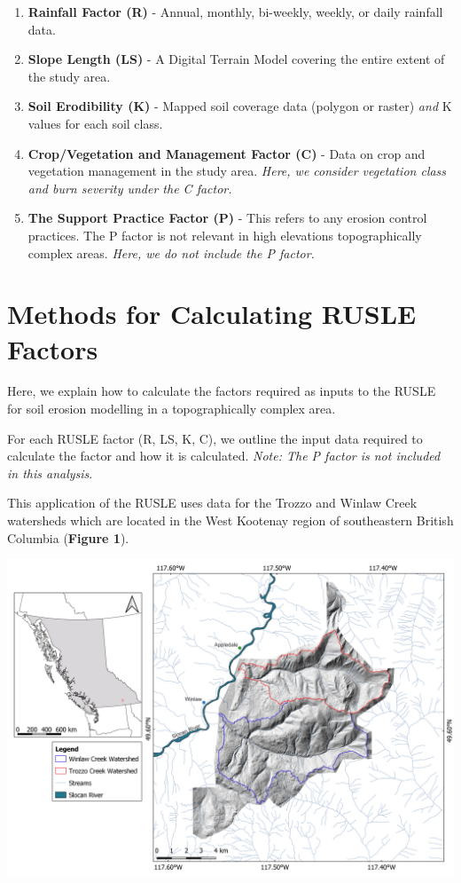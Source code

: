 \documentclass[
]{article}
\begin{document}
\begin{enumerate}
\def\labelenumi{\arabic{enumi}.}
\item
  \textbf{Rainfall Factor (R)} - Annual, monthly, bi-weekly, weekly, or daily rainfall data.
\item
  \textbf{Slope Length (LS)} - A Digital Terrain Model covering the entire extent of the study area.
\item
  \textbf{Soil Erodibility (K)} - Mapped soil coverage data (polygon or raster) \emph{and} K values for each soil class.
\item
  \textbf{Crop/Vegetation and Management Factor (C)} - Data on crop and vegetation management in the study area. \emph{Here, we consider vegetation class and burn severity under the C factor.}
\item
  \textbf{The Support Practice Factor (P)} - This refers to any erosion control practices. The P factor is not relevant in high elevations topographically complex areas. \emph{Here, we do not include the P factor.}
\end{enumerate}

\hypertarget{sec-methods-for-calculating-rusle-factors}{%
\section*{Methods for Calculating RUSLE Factors}\label{sec-methods-for-calculating-rusle-factors}}

Here, we explain how to calculate the factors required as inputs to the RUSLE for soil erosion modelling in a topographically complex area.

For each RUSLE factor (R, LS, K, C), we outline the input data required to calculate the factor and how it is calculated. \emph{Note: The P factor is not included in this analysis}.

This application of the RUSLE uses data for the Trozzo and Winlaw Creek watersheds which are located in the West Kootenay region of southeastern British Columbia (\textbf{Figure 1}).

\includegraphics[width=1\textwidth,height=\textheight]{img/studyarea.png}
\end{document}
